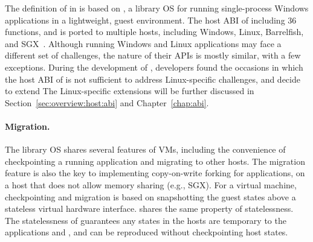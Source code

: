 The definition of \thehostabi{} in \graphene{} is based on
\drawbridge{},
a library OS for running single-process Windows applications
in a lightweight, guest environment.
The host ABI of \drawbridge{} 
including 36 functions,
and is ported to multiple hosts,
including Windows, Linux, Barrelfish, and SGX~\cite{porter11drawbridge,baumann14haven,mssql-on-linux,baumann13bascule}.
Although running Windows and Linux applications may face
a different set of challenges,
the nature of their APIs is mostly similar, with a few exceptions.
During the development of \graphene{}, developers found the occasions in which
the host ABI of \drawbridge{}
is not sufficient to address Linux-specific challenges,
and decide to extend \thehostabi{}
The Linux-specific extensions will be further discussed in Section~\ref{sec:overview:host:abi} and Chapter~\ref{chap:abi}.


\paragraph{Migration.}
The \graphene{} library OS shares several features of VMs, including the convenience of checkpointing a running application and migrating to other hosts.
The migration feature is also the key to implementing copy-on-write forking for applications,
on a host that does not allow memory sharing (e.g., SGX).
For a virtual machine, checkpointing and migration is based on snapshotting the guest states above a stateless virtual hardware interface. %
\Thehostabi{} shares the same property of statelessness.
The statelessness of \thehostabi{} guarantees any states in the hosts are temporary to the applications and \libos{}, and can be reproduced without checkpointing host states.





